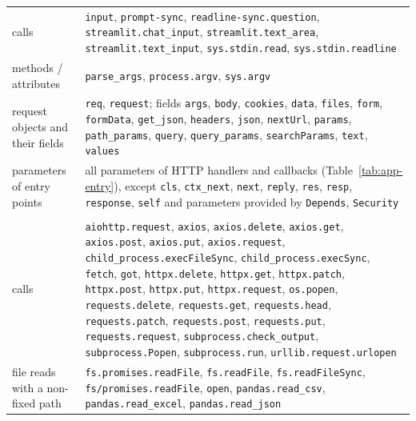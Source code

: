 {\begin{longtable}{@{}>{\raggedright\arraybackslash}p{}>{\raggedright\arraybackslash}p{}@{}}
calls & \texttt{input}, \texttt{prompt-sync}, \texttt{readline-sync.question}, \texttt{streamlit.chat\_input}, \texttt{streamlit.text\_area}, \texttt{streamlit.text\_input}, \texttt{sys.stdin.read}, \texttt{sys.stdin.readline} \\
methods / attributes & \texttt{parse\_args}, \texttt{process.argv}, \texttt{sys.argv} \\
request objects and their fields & \texttt{req}, \texttt{request}; fields \texttt{args}, \texttt{body}, \texttt{cookies}, \texttt{data}, \texttt{files}, \texttt{form}, \texttt{formData}, \texttt{get\_json}, \texttt{headers}, \texttt{json}, \texttt{nextUrl}, \texttt{params}, \texttt{path\_params}, \texttt{query}, \texttt{query\_params}, \texttt{searchParams}, \texttt{text}, \texttt{values} \\
parameters of entry points & all parameters of HTTP handlers and callbacks (Table~\ref{tab:app-entry}), except \texttt{cls}, \texttt{ctx\_next}, \texttt{next}, \texttt{reply}, \texttt{res}, \texttt{resp}, \texttt{response}, \texttt{self} and parameters provided by \texttt{Depends}, \texttt{Security} \\
\addlinespace[3pt]\multicolumn{2}{@{}l}{\emph{external (third party)}} \\
calls & \texttt{aiohttp.request}, \texttt{axios}, \texttt{axios.delete}, \texttt{axios.get}, \texttt{axios.post}, \texttt{axios.put}, \texttt{axios.request}, \texttt{child\_process.execFileSync}, \texttt{child\_process.execSync}, \texttt{fetch}, \texttt{got}, \texttt{httpx.delete}, \texttt{httpx.get}, \texttt{httpx.patch}, \texttt{httpx.post}, \texttt{httpx.put}, \texttt{httpx.request}, \texttt{os.popen}, \texttt{requests.delete}, \texttt{requests.get}, \texttt{requests.head}, \texttt{requests.patch}, \texttt{requests.post}, \texttt{requests.put}, \texttt{requests.request}, \texttt{subprocess.check\_output}, \texttt{subprocess.Popen}, \texttt{subprocess.run}, \texttt{urllib.request.urlopen} \\
file reads with a non-fixed path & \texttt{fs.promises.readFile}, \texttt{fs.readFile}, \texttt{fs.readFileSync}, \texttt{fs/promises.readFile}, \texttt{open}, \texttt{pandas.read\_csv}, \texttt{pandas.read\_excel}, \texttt{pandas.read\_json} \\

\end{longtable}}
